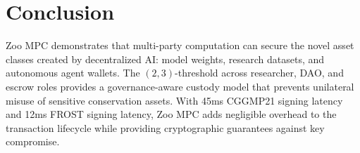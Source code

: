 \section{Conclusion}


Zoo MPC demonstrates that multi-party computation can secure the novel asset classes created by decentralized AI: model weights, research datasets, and autonomous agent wallets. The $(2, 3)$-threshold across researcher, DAO, and escrow roles provides a governance-aware custody model that prevents unilateral misuse of sensitive conservation assets. With 45ms CGGMP21 signing latency and 12ms FROST signing latency, Zoo MPC adds negligible overhead to the transaction lifecycle while providing cryptographic guarantees against key compromise.

